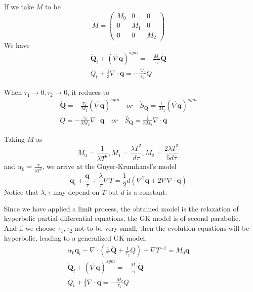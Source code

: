 \documentclass[a4paper]{article}
\begin{document}
If we take $M$ to be 
\begin{equation}
M=\left( \begin{array}{lll} M_0 & 0 & 0 \\0 & M_1 & 0 \\0 & 0 & M_2 \end{array} \right)
\end{equation}
We have
\begin{eqnarray}
\mathring{\mathbf{Q}}_t+(\mathring{\nabla \mathbf{q}})^{sym}=-\frac{M_1}{\tau_1}\mathring{\mathbf{Q}} \\
Q_t+\frac{1}{3} \nabla \cdot \mathbf{q}=-\frac{M_2}{\tau_2}Q
\end{eqnarray}

When $\tau_1 \to 0, \tau_2 \to 0$, it reduces to
\begin{eqnarray} 
\mathring{\mathbf{Q}}=-\frac{\tau_1}{M_1}(\mathring{\nabla \mathbf{q}})^{sym} \quad  or \quad \mathring{S}_\mathbf{Q}=\frac{1}{M_1}(\mathring{\nabla \mathbf{q}})^{sym} \\
Q=-\frac{\tau_2}{3M_2}\nabla \cdot \mathbf{q} \quad or \quad \bar{S}_\mathbf{Q}=\frac{1}{3M_2} \nabla \cdot \mathbf{q}
\end{eqnarray}

Taking $M$ as
\begin{equation}
M_0=\frac{1}{\lambda T^2}, M_1=\frac{\lambda T^2}{d\tau}, M_2=\frac{2\lambda T^2}{5d\tau}
\end{equation}
and $\alpha_0=\frac{\tau}{\lambda T^2}$,
we arrive at the Guyer-Krumhansl's model \cite{Jou1996extended}
\begin{equation}
\mathbf{q}_t+\frac{\mathbf{q}}{\tau}+\frac{\lambda}{\tau}\nabla T=\frac{1}{2}d(\nabla^2 \mathbf{q}+2\nabla \nabla \cdot \mathbf{q})
\end{equation}
Notice that $\lambda, \tau$ may depend on $T$ but $d$ is a constant.

Since we have applied a limit process, the obtained model is the relaxation of hyperbolic partial differential equations. the GK model is of second parabolic. And if we choose $\tau_1,\tau_2$ not to be very small, then the evolution equations will be hyperbolic, leading to a generalized GK model.
\begin{eqnarray}
\alpha_0 \mathbf{q}_t - \nabla \cdot ({\frac{1}{\tau_1} \mathring{\mathbf{Q}}}+\frac{1}{\tau_2}Q)+\nabla T^{-1} = M_0 \mathbf{q} \\
\mathring{\mathbf{Q}}_t+(\mathring{\nabla \mathbf{q}})^{sym}=-\frac{M_1}{\tau_1}\mathring{\mathbf{Q}} \\
Q_t+\frac{1}{3} \nabla \cdot \mathbf{q}=-\frac{M_2}{\tau_2}Q
\end{eqnarray}
\end{document}
